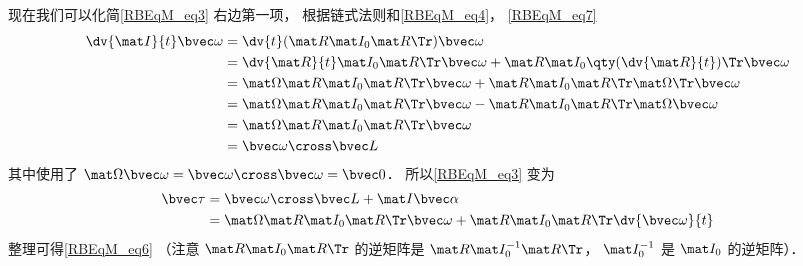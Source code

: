 现在我们可以化简\autoref{RBEqM_eq3} 右边第一项， 根据链式法则和\autoref{RBEqM_eq4}， \autoref{RBEqM_eq7}
\begin{equation}
\begin{aligned}
\dv{\mat I}{t}\bvec\omega &= \dv{t}(\mat R \mat I_0 \mat R\Tr)\bvec\omega\\
&= \dv{\mat R}{t} \mat I_0 \mat R\Tr \bvec\omega + \mat R \mat I_0 \qty(\dv{\mat R}{t})\Tr \bvec\omega\\
&= \mat \Omega \mat R \mat I_0 \mat R\Tr \bvec\omega + \mat R \mat I_0 \mat R\Tr \mat \Omega\Tr \bvec\omega\\
&= \mat \Omega \mat R \mat I_0 \mat R\Tr \bvec\omega - \mat R \mat I_0 \mat R\Tr \mat \Omega \bvec\omega\\
&= \mat \Omega \mat R \mat I_0 \mat R\Tr \bvec\omega\\
&= \bvec \omega \cross \bvec L
\end{aligned}
\end{equation}
其中使用了 $\mat \Omega \bvec\omega = \bvec\omega \cross \bvec\omega = \bvec 0$． 所以\autoref{RBEqM_eq3} 变为
\begin{equation}
\begin{aligned}
\bvec\tau &= \bvec\omega \cross \bvec L + \mat I \bvec\alpha\\
&= \mat \Omega \mat R \mat I_0 \mat R\Tr \bvec\omega + \mat R \mat I_0 \mat R\Tr \dv{\bvec\omega}{t}
\end{aligned}
\end{equation}
整理可得\autoref{RBEqM_eq6} （注意 $\mat R \mat I_0 \mat R\Tr$ 的逆矩阵是 $\mat R \mat I_0^{-1} \mat R\Tr$， $\mat I_0^{-1}$ 是 $\mat I_0$ 的逆矩阵）．%
